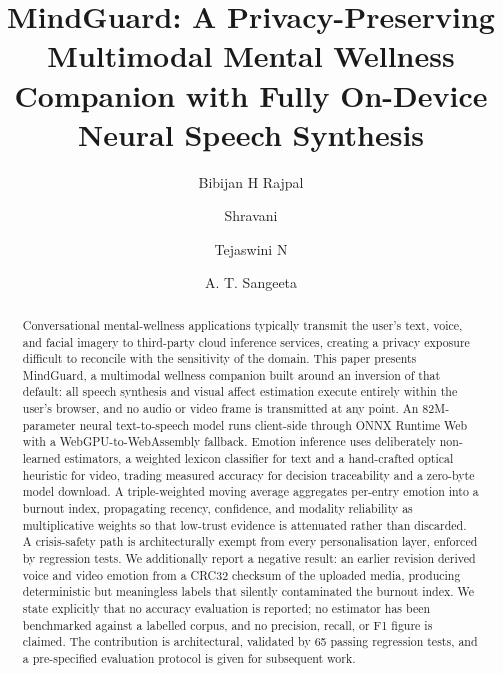 \documentclass[runningheads]{llncs}
\begin{document}
\title{MindGuard: A Privacy-Preserving Multimodal Mental Wellness
Companion with Fully On-Device Neural Speech Synthesis}


\author{%
Bibijan H Rajpal \and
Shravani \and
Tejaswini N \and
A. T. Sangeeta}



\maketitle

\begin{abstract}
Conversational mental-wellness applications typically transmit the user's text,
voice, and facial imagery to third-party cloud inference services, creating a
privacy exposure difficult to reconcile with the sensitivity of the domain.
This paper presents MindGuard, a multimodal wellness companion built around an
inversion of that default: all speech synthesis and visual affect estimation
execute entirely within the user's browser, and no audio or video frame is
transmitted at any point. An 82M-parameter neural text-to-speech model runs
client-side through ONNX Runtime Web with a WebGPU-to-WebAssembly fallback.
Emotion inference uses deliberately non-learned estimators, a weighted lexicon
classifier for text and a hand-crafted optical heuristic for video, trading
measured accuracy for decision traceability and a zero-byte model download. A
triple-weighted moving average aggregates per-entry emotion into a burnout
index, propagating recency, confidence, and modality reliability as
multiplicative weights so that low-trust evidence is attenuated rather than
discarded. A crisis-safety path is architecturally exempt from every
personalisation layer, enforced by regression tests. We additionally report a
negative result: an earlier revision derived voice and video emotion from a
CRC32 checksum of the uploaded media, producing deterministic but meaningless
labels that silently contaminated the burnout index. We state explicitly that
no accuracy evaluation is reported; no estimator has been benchmarked against a
labelled corpus, and no precision, recall, or F1 figure is claimed. The
contribution is architectural, validated by 65 passing regression tests, and a
pre-specified evaluation protocol is given for subsequent work.

\end{abstract}
\end{document}

